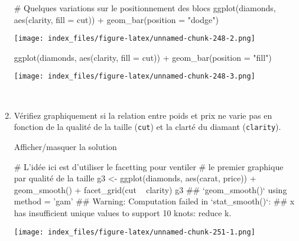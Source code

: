 \documentclass[12pt,]{article}
\newenvironment{Shaded}{}{}
\newcommand{\KeywordTok}[1]{\textcolor[rgb]{0.00,0.00,1.00}{{#1}}}
\newcommand{\DataTypeTok}[1]{{#1}}
\newcommand{\StringTok}[1]{\textcolor[rgb]{0.00,0.50,0.50}{{#1}}}
\newcommand{\CommentTok}[1]{\textcolor[rgb]{0.00,0.50,0.00}{{#1}}}
\newcommand{\NormalTok}[1]{{#1}}
\begin{document}
\begin{enumerate}
\begin{Shaded}
\begin{Highlighting}[]
\CommentTok{# Quelques variations sur le positionnement des blocs}
\KeywordTok{ggplot}\NormalTok{(diamonds, }\KeywordTok{aes}\NormalTok{(clarity, }\DataTypeTok{fill =} \NormalTok{cut)) +}\StringTok{ }\KeywordTok{geom_bar}\NormalTok{(}\DataTypeTok{position =} \StringTok{"dodge"}\NormalTok{)}
\end{Highlighting}
\end{Shaded}

  \texttt{[image: index\_files/figure-latex/unnamed-chunk-248-2.png]}

\begin{Shaded}
\begin{Highlighting}[]
\KeywordTok{ggplot}\NormalTok{(diamonds, }\KeywordTok{aes}\NormalTok{(clarity, }\DataTypeTok{fill =} \NormalTok{cut)) +}\StringTok{ }\KeywordTok{geom_bar}\NormalTok{(}\DataTypeTok{position =} \StringTok{"fill"}\NormalTok{)}
\end{Highlighting}
\end{Shaded}

  \texttt{[image: index\_files/figure-latex/unnamed-chunk-248-3.png]}

  ~
\item
  Vérifiez graphiquement si la relation entre poids et prix ne varie pas
  en fonction de la qualité de la taille (\texttt{cut}) et la clarté du
  diamant (\texttt{clarity}).

  Afficher/masquer la solution

  \hypertarget{sol69}{}
\begin{Shaded}
\begin{Highlighting}[]
\CommentTok{# L'idée ici est d'utiliser le facetting pour ventiler}
\CommentTok{# le premier graphique par qualité de la taille }
\NormalTok{g3 <-}\StringTok{ }\KeywordTok{ggplot}\NormalTok{(diamonds, }\KeywordTok{aes}\NormalTok{(carat, price)) +}\StringTok{ }\KeywordTok{geom_smooth}\NormalTok{() +}
\StringTok{  }\KeywordTok{facet_grid}\NormalTok{(cut ~}\StringTok{ }\NormalTok{clarity)}
\NormalTok{g3}
\NormalTok{## `geom_smooth()` using method = 'gam'}
\NormalTok{## Warning: Computation failed in `stat_smooth()`:}
\NormalTok{## x has insufficient unique values to support 10 knots: reduce k.}
\end{Highlighting}
\end{Shaded}

  \texttt{[image: index\_files/figure-latex/unnamed-chunk-251-1.png]}

  ~
\end{enumerate}
\end{document}
